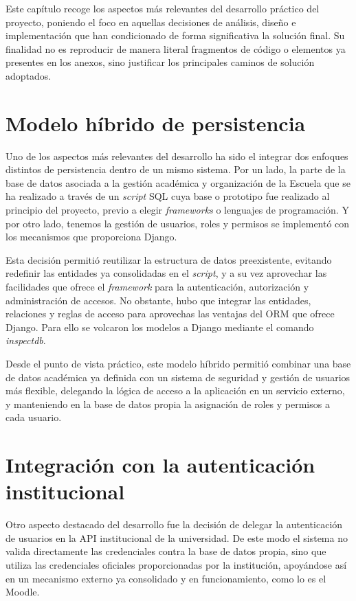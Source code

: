 
Este capítulo recoge los aspectos más relevantes del desarrollo práctico del proyecto, poniendo el foco en aquellas decisiones de análisis, diseño e implementación que han condicionado de forma significativa la solución final. Su finalidad no es reproducir de manera literal fragmentos de código o elementos ya presentes en los anexos, sino justificar los principales caminos de solución adoptados.

\section{Modelo híbrido de persistencia}

Uno de los aspectos más relevantes del desarrollo ha sido el integrar dos enfoques distintos de persistencia dentro de un mismo sistema. Por un lado, la parte de la base de datos asociada a la gestión académica y organización de la Escuela que se ha realizado a través de un \textit{script} SQL cuya base o prototipo fue realizado al principio del proyecto, previo a elegir \textit{frameworks} o lenguajes de programación. Y por otro lado, tenemos la gestión de usuarios, roles y permisos se implementó con los mecanismos que proporciona Django.

Esta decisión permitió reutilizar la estructura de datos preexistente, evitando redefinir las entidades ya consolidadas en el \textit{script}, y a su vez aprovechar las facilidades que ofrece el \textit{framework} para la autenticación, autorización y administración de accesos. No obstante, hubo que integrar las entidades, relaciones y reglas de acceso para aprovechas las ventajas del ORM que ofrece Django. Para ello se volcaron los modelos a Django mediante el comando \textit{inspectdb}.

Desde el punto de vista práctico, este modelo híbrido permitió combinar una base de datos académica ya definida con un sistema de seguridad y gestión de usuarios más flexible, delegando la lógica de acceso a la aplicación en un servicio externo, y manteniendo en la base de datos propia la asignación de roles y permisos a cada usuario.

\section{Integración con la autenticación institucional}

Otro aspecto destacado del desarrollo fue la decisión de delegar la autenticación de usuarios en la API institucional de la universidad. De este modo el sistema no valida directamente las credenciales contra la base de datos propia, sino que utiliza las credenciales oficiales proporcionadas por la institución, apoyándose así en un mecanismo externo ya consolidado y en funcionamiento, como lo es el Moodle.

